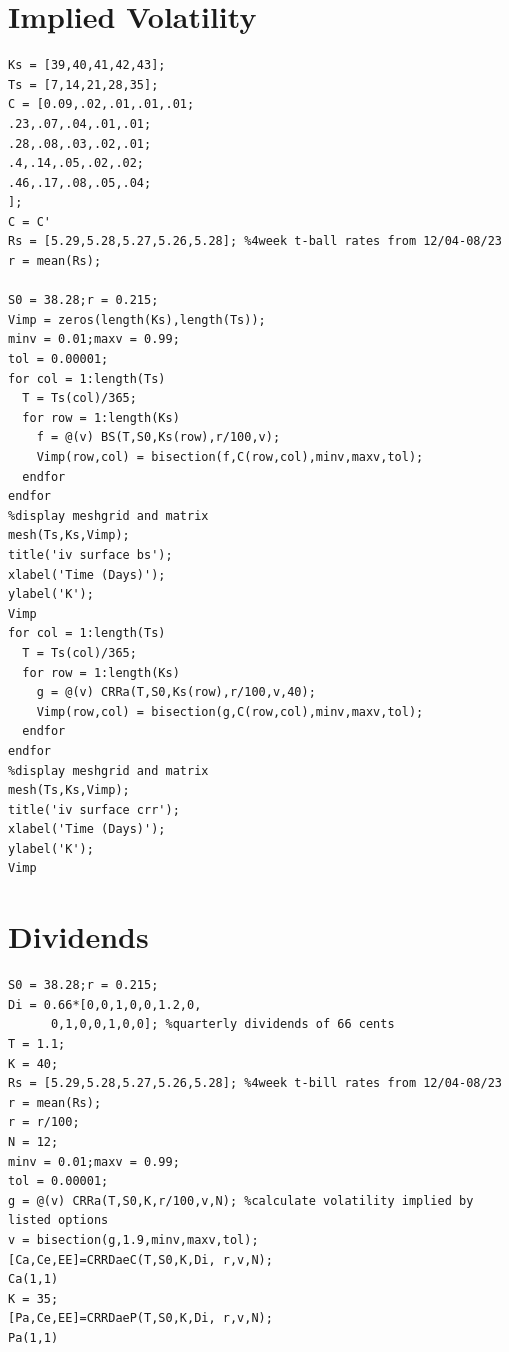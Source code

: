 \documentclass{article}
\begin{document}
\section{Implied Volatility}
\label{app:appendix1}
\begin{lstlisting}
Ks = [39,40,41,42,43];
Ts = [7,14,21,28,35];
C = [0.09,.02,.01,.01,.01;
.23,.07,.04,.01,.01;
.28,.08,.03,.02,.01;
.4,.14,.05,.02,.02;
.46,.17,.08,.05,.04;
];
C = C'
Rs = [5.29,5.28,5.27,5.26,5.28]; %4week t-ball rates from 12/04-08/23
r = mean(Rs);

S0 = 38.28;r = 0.215;
Vimp = zeros(length(Ks),length(Ts));
minv = 0.01;maxv = 0.99;
tol = 0.00001;
for col = 1:length(Ts)
  T = Ts(col)/365;
  for row = 1:length(Ks)
    f = @(v) BS(T,S0,Ks(row),r/100,v);
    Vimp(row,col) = bisection(f,C(row,col),minv,maxv,tol);
  endfor
endfor
%display meshgrid and matrix
mesh(Ts,Ks,Vimp);
title('iv surface bs');
xlabel('Time (Days)');
ylabel('K');
Vimp
for col = 1:length(Ts)
  T = Ts(col)/365;
  for row = 1:length(Ks)
    g = @(v) CRRa(T,S0,Ks(row),r/100,v,40);
    Vimp(row,col) = bisection(g,C(row,col),minv,maxv,tol);
  endfor
endfor
%display meshgrid and matrix
mesh(Ts,Ks,Vimp);
title('iv surface crr');
xlabel('Time (Days)');
ylabel('K');
Vimp
\end{lstlisting}
\section{Dividends}
\label{app:appendix2}
\begin{lstlisting}
S0 = 38.28;r = 0.215; 
Di = 0.66*[0,0,1,0,0,1.2,0,
      0,1,0,0,1,0,0]; %quarterly dividends of 66 cents
T = 1.1;
K = 40;
Rs = [5.29,5.28,5.27,5.26,5.28]; %4week t-bill rates from 12/04-08/23
r = mean(Rs);
r = r/100;
N = 12;
minv = 0.01;maxv = 0.99;
tol = 0.00001;
g = @(v) CRRa(T,S0,K,r/100,v,N); %calculate volatility implied by listed options
v = bisection(g,1.9,minv,maxv,tol);
[Ca,Ce,EE]=CRRDaeC(T,S0,K,Di, r,v,N);
Ca(1,1)
K = 35;
[Pa,Ce,EE]=CRRDaeP(T,S0,K,Di, r,v,N);
Pa(1,1)

\end{lstlisting}
\end{document}
